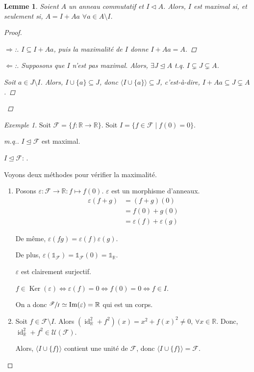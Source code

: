 \documentclass{report}
\newtheorem*{lem}{Lemme}
\theoremstyle{definition}
\theoremstyle{remark}
\newtheorem*{exem}{Exemple}
\newenvironment*{subproof}[1][D\'emonstration]
{
\begin{proof}[#1]

}
{
\renewcommand{\qedsymbol}{$\blacksquare$}
\end{proof}
\renewcommand{\qedsymbol}{$\square$}
}
\def\RR{\mathbb{R}}
\def\id{\mathds{1}}
\def\im{\operatorname{Im}}
\def\noyau{\operatorname{Ker}}
\begin{document}
	\begin{lem}
		Soient $A$ un anneau commutatif et $I \triangleleft A$. Alors, $I$ est maximal si, et seulement si, $A=I+Aa$ $\forall a\in A\setminus I$.
		\begin{proof}
			\begin{subproof}[$\Rightarrow$:]
				$I\subseteq I+Aa$, puis la maximalit\'e de $I$ donne $I+Aa=A$.
			\end{subproof}
			\begin{subproof}[$\Leftarrow$:]
				Supposons que $I$ n'est pas maximal. Alors, $\exists J\trianglelefteq A$ t.q. $I \subsetneq J \subsetneq A$.

				Soit $a\in J\setminus I$. Alors, $I\cup \{a\}\subseteq J$, donc $\langle I\cup\{a\} \rangle \subseteq J$, c'est-\`a-dire, $I+Aa\subseteq J \subsetneq A$.
			\end{subproof}
		\end{proof}
	\end{lem}

	\begin{exem}
		Soit $\mathscr{F} = \{f:\RR\to\RR\}$. Soit $I = \{f\in\mathscr{F} \mid f(0)=0\}$.
		\begin{proof}[m.q.]
			$I\trianglelefteq\mathscr{F}$ est maximal.

			$I\trianglelefteq\mathscr{F}$: \checkmark.

			Voyons deux m\'ethodes pour v\'erifier la maximalit\'e.
			\begin{enumerate}
				\item Posons $\varepsilon : \mathscr{F}\to\RR : f\mapsto f(0)$. $\varepsilon$ est un morphisme d'anneaux.
				\begin{align*}
					\varepsilon(f+g)&= (f+g)(0)\\
					&= f(0)+g(0)\\
					&= \varepsilon(f)+\varepsilon(g)
				\end{align*}

				De m\^eme, $\varepsilon(fg)=\varepsilon(f)\varepsilon(g)$.

				De plus, $\varepsilon(\id_\mathscr{F})=\id_\mathscr{F}(0)=\id_\RR$.

				$\varepsilon$ est clairement surjectif.

				$f\in\noyau(\varepsilon) \Leftrightarrow \varepsilon(f)=0 \Leftrightarrow f(0)=0 \Leftrightarrow f\in I$.

				On a donc $\sfrac{\mathscr{F}}{I} \simeq \im(\varepsilon) = \RR$ qui est un corps.
				\item Soit $f\in\mathscr{F}\setminus I$. Alors $(\operatorname{id}_\RR^2+f^2)(x) = x^2+f(x)^2 \neq 0$, $\forall x\in\RR$. Donc, $\operatorname{id}_\RR^2+f^2\in\mathcal{U}(\mathscr{F})$.

				Alors, $\langle I\cup\{f\} \rangle$ contient une unit\'e de $\mathscr{F}$, donc $\langle I\cup\{f\} \rangle = \mathscr{F}$.
			\end{enumerate}
		\end{proof}
	\end{exem}
\end{document}
